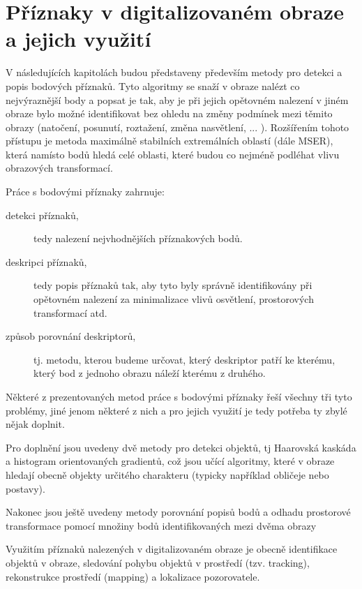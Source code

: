 
\chapter{Příznaky v digitalizovaném obraze a jejich využití}

V následujících kapitolách budou představeny především metody pro detekci a popis bodových příznaků. Tyto algoritmy se snaží v obraze nalézt co nejvýraznější body a popsat je tak, aby je při jejich opětovném nalezení v jiném obraze bylo možné identifikovat bez ohledu na změny podmínek mezi těmito obrazy (natočení, posunutí, roztažení, změna nasvětlení, ... ). Rozšířením tohoto přístupu je metoda maximálně stabilních extremálních oblastí (dále MSER), která  namísto bodů hledá celé oblasti, které budou co nejméně podléhat vlivu obrazových transformací. 

Práce s bodovými příznaky zahrnuje:

\begin{description}
	\item[detekci příznaků,] tedy nalezení nejvhodnějších příznakových bodů.
	\item[deskripci příznaků,] tedy popis příznaků tak, aby tyto byly správně identifikovány při opětovném nalezení za minimalizace vlivů osvětlení, prostorových transformací atd.
	\item[způsob porovnání deskriptorů,] tj. metodu, kterou budeme určovat, který deskriptor patří ke kterému, který bod z jednoho obrazu náleží kterému z druhého.
\end{description} 

Některé z prezentovaných metod práce s bodovými příznaky řeší všechny tři tyto problémy, jiné jenom některé z nich a pro jejich využití je tedy potřeba ty zbylé nějak doplnit.

Pro doplnění jsou uvedeny dvě metody pro detekci objektů, tj Haarovská kaskáda a histogram orientovaných gradientů, což jsou učící algoritmy, které v obraze hledají obecně objekty určitého charakteru (typicky například obličeje nebo postavy).

Nakonec jsou ještě uvedeny metody porovnání popisů bodů a odhadu prostorové transformace pomocí množiny bodů identifikovaných mezi dvěma obrazy

Využitím příznaků nalezených v digitalizovaném obraze je obecně identifikace objektů v obraze, sledování pohybu objektů v prostředí (tzv. tracking), rekonstrukce prostředí (mapping) a lokalizace pozorovatele.


